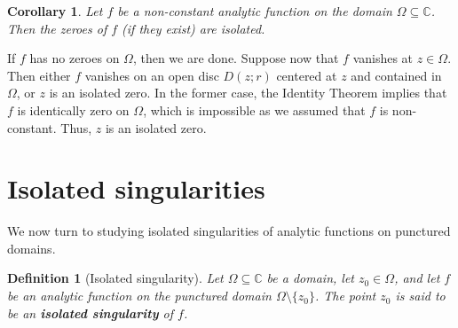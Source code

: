 \documentclass[10pt]{article}
\makeatletter
\newcommand{\C}{\mathbb{C}}
\theoremstyle{newstyle}
\newtheorem{cor}[thm]{Corollary}
\newtheorem{defn}[thm]{Definition}
\newenvironment{pf}[1][\proofname]{\par
  \pushQED{\qed}%
  \normalfont \topsep0\p@\relax
  \trivlist
  \item[\hskip\labelsep\scshape
  #1\@addpunct{.}]\ignorespaces
}{%
  \popQED\endtrivlist\@endpefalse
}
\makeatother
\begin{document}
\begin{cor}
Let $f$ be a non-constant analytic function on the domain $\Omega \subseteq \C$. 
Then the zeroes of $f$ (if they exist) are isolated.
\end{cor}
\begin{pf}
If $f$ has no zeroes on $\Omega$, then we are done. Suppose now that $f$ vanishes at $z \in \Omega$. 
Then either $f$ vanishes on an open disc $D(z; r)$ centered at $z$ and contained in $\Omega$, 
or $z$ is an isolated zero. In the former case, the Identity Theorem implies that $f$ is 
identically zero on $\Omega$, which is impossible as we assumed that $f$ is non-constant. Thus, 
$z$ is an isolated zero. 
\end{pf}

\newpage
\section{Isolated singularities}

We now turn to studying isolated singularities of analytic functions on punctured domains.

\begin{defn}[Isolated singularity]
Let $\Omega \subseteq \C$ be a domain, let $z_0 \in \Omega$, and let 
$f$ be an analytic function on the punctured domain $\Omega \setminus \{z_0\}$. The 
point $z_0$ is said to be an {\bf isolated singularity} of $f$. 
\end{defn}
\end{document}
